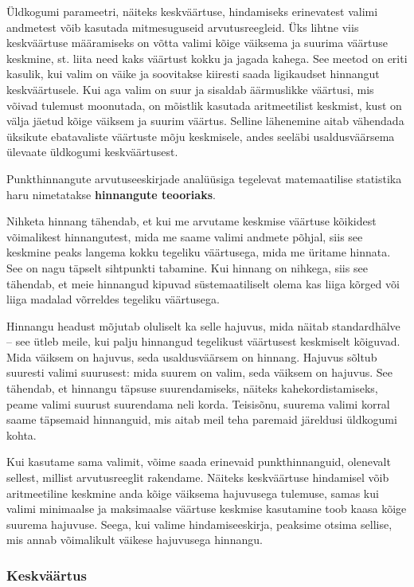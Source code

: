 \documentclass[
]{book}
\begin{document}
Üldkogumi parameetri, näiteks keskväärtuse, hindamiseks erinevatest valimi andmetest võib kasutada mitmesuguseid arvutusreegleid. Üks lihtne viis keskväärtuse määramiseks on võtta valimi kõige väiksema ja suurima väärtuse keskmine, st. liita need kaks väärtust kokku ja jagada kahega. See meetod on eriti kasulik, kui valim on väike ja soovitakse kiiresti saada ligikaudset hinnangut keskväärtusele. Kui aga valim on suur ja sisaldab äärmuslikke väärtusi, mis võivad tulemust moonutada, on mõistlik kasutada aritmeetilist keskmist, kust on välja jäetud kõige väiksem ja suurim väärtus. Selline lähenemine aitab vähendada üksikute ebatavaliste väärtuste mõju keskmisele, andes seeläbi usaldusväärsema ülevaate üldkogumi keskväärtusest.

Punkthinnangute arvutuseeskirjade analüüsiga tegelevat matemaatilise statistika haru nimetatakse \textbf{hinnangute teooriaks}.

Nihketa hinnang tähendab, et kui me arvutame keskmise väärtuse kõikidest võimalikest hinnangutest, mida me saame valimi andmete põhjal, siis see keskmine peaks langema kokku tegeliku väärtusega, mida me üritame hinnata. See on nagu täpselt sihtpunkti tabamine. Kui hinnang on nihkega, siis see tähendab, et meie hinnangud kipuvad süstemaatiliselt olema kas liiga kõrged või liiga madalad võrreldes tegeliku väärtusega.

Hinnangu headust mõjutab oluliselt ka selle hajuvus, mida näitab standardhälve -- see ütleb meile, kui palju hinnangud tegelikust väärtusest keskmiselt kõiguvad. Mida väiksem on hajuvus, seda usaldusväärsem on hinnang. Hajuvus sõltub suuresti valimi suurusest: mida suurem on valim, seda väiksem on hajuvus. See tähendab, et hinnangu täpsuse suurendamiseks, näiteks kahekordistamiseks, peame valimi suurust suurendama neli korda. Teisisõnu, suurema valimi korral saame täpsemaid hinnanguid, mis aitab meil teha paremaid järeldusi üldkogumi kohta.

Kui kasutame sama valimit, võime saada erinevaid punkthinnanguid, olenevalt sellest, millist arvutusreeglit rakendame. Näiteks keskväärtuse hindamisel võib aritmeetiline keskmine anda kõige väiksema hajuvusega tulemuse, samas kui valimi minimaalse ja maksimaalse väärtuse keskmise kasutamine toob kaasa kõige suurema hajuvuse. Seega, kui valime hindamiseeskirja, peaksime otsima sellise, mis annab võimalikult väikese hajuvusega hinnangu.

\subsubsection{Keskväärtus}\label{keskvuxe4uxe4rtus}
\end{document}
